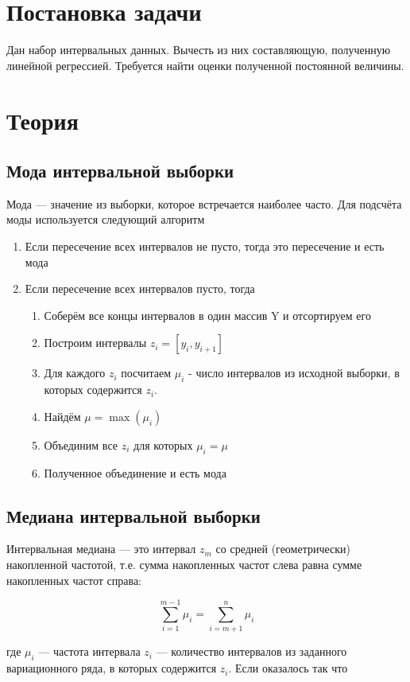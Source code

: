 \documentclass[a4paper,12pt]{article}
\begin{document}

\newpage
\tableofcontents
\newpage
\listoffigures
\newpage
\section{Постановка задачи}
Дан набор интервальных данных. Вычесть из них составляющую, полученную линейной регрессией. Требуется найти оценки полученной постоянной величины.

\section{Теория}
\subsection{Мода интервальной выборки}
Мода — значение из выборки, которое встречается наиболее часто. Для подсчёта моды используется следующий алгоритм
\begin{enumerate}
\item Если пересечение всех интервалов не пусто, тогда это пересечение и есть мода
\item Если пересечение всех интервалов пусто, тогда
    \begin{enumerate}
        \item Соберём все концы интервалов в один массив Y и отсортируем его
        \item Построим интервалы $z_i = [y_i, y_{i+1}]$
        \item Для каждого $z_i$ посчитаем $\mu_i$ - число интервалов из исходной выборки, в которых содержится $z_i$.
        \item Найдём $\mu = \max(\mu_i)$
        \item Объединим все $z_i$ для которых $\mu_i = \mu$
        \item Полученное объединение и есть мода
    \end{enumerate}
\end{enumerate}
\subsection{Медиана интервальной выборки}
Интервальная медиана — это интервал $z_m$ со средней (геометрически)
накопленной частотой, т.е. сумма накопленных частот слева равна сумме
накопленных частот справа:

$$\sum_{i = 1}^{m - 1}{\mu_i} = \sum_{i = m + 1}^{n}{\mu_i}$$

где $\mu_i$ — частота интервала $z_i$ — количество интервалов из заданного вариационного ряда, в которых содержится $z_i$. Если оказалось так что 
\end{document}

